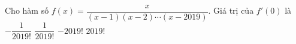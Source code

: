 \begin{ex}%
	Cho hàm số $ f(x) = \dfrac{x}{ (x - 1)(x - 2) \cdots (x - 2019) } $. Giá trị của $ f'(0) $ là
	\choice
	{\True $ - \dfrac{1}{2019!} $}
	{$ \dfrac{1}{2019!} $}
	{$ -2019! $}
	{$ 2019! $}
\end{ex}